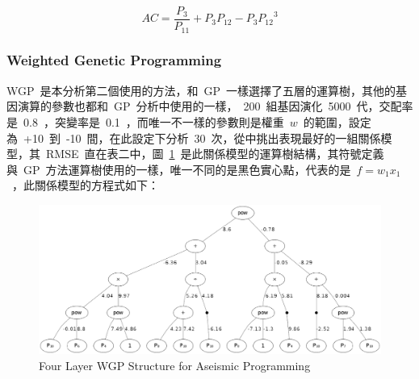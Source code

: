 \begin{equation} AC = \dfrac{P_3}{P_{11}} + P_3 P_{12} - P_3 {P_{12}}^3  \label{eq:GP_AC}\end{equation}

\subsubsection{Weighted Genetic Programming}

WGP~是本分析第二個使用的方法，和~GP~一樣選擇了五層的運算樹，其他的基因演算的參數也都和~GP~分析中使用的一樣，~200~組基因演化~5000~代，交配率是~0.8~，突變率是~0.1~，而唯一不一樣的參數則是權重~$w$~的範圍，設定為~+10~到~-10~間，在此設定下分析~30~次，從中挑出表現最好的一組關係模型，其~RMSE~直在表二中，圖~\ref{fig:4LWGP}~是此關係模型的運算樹結構，其符號定義與~GP~方法運算樹使用的一樣，唯一不同的是黑色實心點，代表的是~$f = w_1x_1$~，此關係模型的方程式如下：

\begin{figure}[hbtp]
  \begin{center}
    \includegraphics[width=1.0\textwidth]{figures/4-layer-wgp.png}
    \caption{Four Layer WGP Structure for Aseismic Programming} 
    \label{fig:4LWGP}
  \end{center}
\end{figure}



